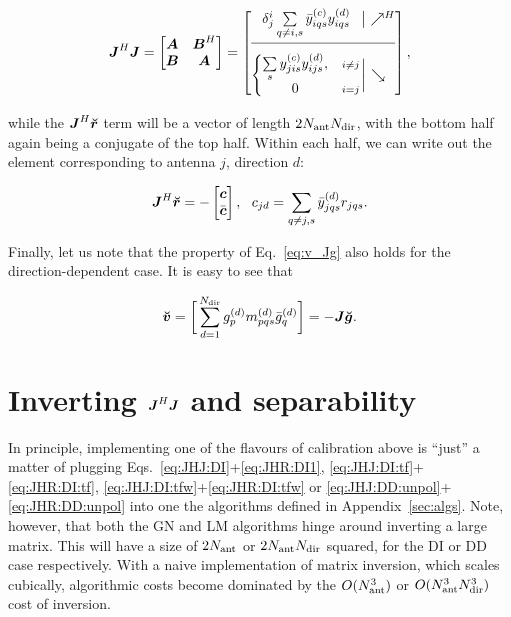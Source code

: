 \documentclass[useAMS,usenatbib]{mn2e}
\newcommand{\mat}[1]{{\bmath{#1}}}
\newcommand{\JJ}{\mat{J}} %
\newcommand{\JHJ}{\JJ^H\JJ} %
\begin{document}
\begin{equation}
\JHJ = \Matrix{cc}{\bmath{A}&\bmath{B}^H\\\bmath{B}&\bmath{A}}
= \JHJblocks{
  \delta^i_j \sum\limits_{q\ne i,s} \yycH_{iqs} \yyd_{iqs} 
}{
  \left \{ 
  \begin{array}{@{}cc@{}}
   \sum\limits_{s} \yyc_{jis} \yyd_{ijs},&{\scriptstyle i\ne j} \\
   0 &{\scriptstyle i=j}
  \end{array} \right . 
},
\label{eq:JHJ:DD:unpol}
\end{equation}

while the $\JJ^H\Rr$ term will be a vector of length $2N_\mathrm{ant}N_\mathrm{dir}$, with the bottom half again being
a conjugate of the top half. Within each half, we can write out the element corresponding to 
antenna $j$, direction $d$: 

\begin{equation}
\label{eq:JHR:DD:unpol}
\JJ^H\Rr = -\Matrix{c}{\bmath{c}\\\bar{\bmath{c}}},~~c_{jd} = \sum\limits_{q\ne j,s} 
\yydH_{jqs} r_{jqs}.
\end{equation}

Finally, let us note that the property of Eq.~\ref{eq:v_Jg} also holds for the direction-dependent case. It is easy to see that

\begin{equation}
\label{eq:v_Jg:dd}
\Vv = \bigg [ \sum_{d=1}^{\Nd} \ggd_p \mmd_{pqs} \ggdH_q \bigg ] = -\JJ \Gg.
\end{equation}


\section{Inverting $\JJ^H\JJ$ and separability}
\label{sec:separability}

In principle, implementing one of the flavours of calibration above is ``just'' a matter of  
plugging Eqs.~\ref{eq:JHJ:DI}+\ref{eq:JHR:DI1}, \ref{eq:JHJ:DI:tf}+\ref{eq:JHR:DI:tf},
\ref{eq:JHJ:DI:tfw}+\ref{eq:JHR:DI:tfw} or \ref{eq:JHJ:DD:unpol}+\ref{eq:JHR:DD:unpol} into one the algorithms defined in 
Appendix~\ref{sec:algs}. Note, however, that both the GN and LM algorithms hinge around 
inverting a large matrix. This will have a size of $2N_\mathrm{ant}$ or $2N_\mathrm{ant}N_\mathrm{dir}$ squared, 
for the DI or DD case respectively. With a naive implementation of matrix inversion, 
which scales cubically, algorithmic costs become dominated by the $O(N_\mathrm{ant}^3)$ or $O(N_\mathrm{ant}^3N_\mathrm{dir}^3)$
cost of inversion.
\end{document}
